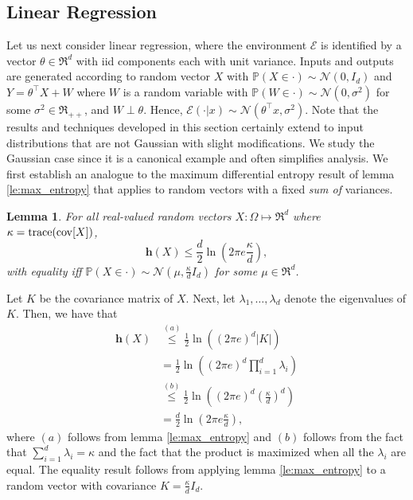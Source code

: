 \documentclass[twoside,11pt]{article}
\renewenvironment{proof}{\par\noindent{\bf Proof\ }}{\hfill\BlackBox\\[2mm]}
\newenvironment{proof}{\par\noindent{\bf Proof\ }}{\hfill\BlackBox\\[2mm]}
\newtheorem{lemma}[theorem]{Lemma}
\def\environment{\mathcal{E}}
\def\normal{\mathcal{N}}
\def\diffentropy{\bf h}
\def\diffentropy{\mathbf{h}}
\def\Pr{\mathbb{P}}
\begin{document}
\subsection{Linear Regression}\label{subsec:lin_reg}
Let us next consider linear regression, where the environment $\environment$ is identified by a vector $\theta\in\Re^d$ with iid components each with unit variance.  Inputs and outputs are generated according to random vector $X$ with $\Pr(X\in\cdot)\sim \mathcal{N}(0, I_d)$ and $Y = \theta^\top X + W$ where $W$ is a random variable with $\Pr(W\in\cdot) \sim \mathcal{N}(0, \sigma^2)$ for some $\sigma^2 \in \Re_{++}$, and $W \perp \theta$. Hence, $\environment(\cdot|x) \sim \normal(\theta^\top x, \sigma^2)$. Note that the results and techniques developed in this section certainly extend to input distributions that are not Gaussian with slight modifications. We study the Gaussian case since it is a canonical example and often simplifies analysis. We first establish an analogue to the maximum differential entropy result of lemma \ref{le:max_entropy} that applies to random vectors with a fixed \emph{sum of} variances. 

\begin{lemma}
    \label{le:max_sum_ent}
    For all real-valued random vectors $X: \Omega\mapsto\Re^d$ where $\kappa = {\rm trace}({\rm cov}[X])$,
    $$\diffentropy(X) \leq \frac{d}{2}\ln\left(2\pi e\frac{\kappa}{d}\right),$$
    with equality iff $\Pr(X\in\cdot)\sim \mathcal{N}(\mu, \frac{\kappa}{d}I_d)$ for some $\mu\in\Re^d$.
\end{lemma}
\begin{proof}
    Let $K$ be the covariance matrix of $X$. Next, let $\lambda_1, \hdots, \lambda_d$ denote the eigenvalues of $K$. Then, we have that
    \begin{align*}
        \diffentropy(X)
        & \overset{(a)}{\leq} \frac{1}{2}\ln\left((2\pi e)^d |K|\right)\\
        & = \frac{1}{2}\ln\left((2\pi e)^d \prod_{i=1}^{d} \lambda_i\right)\\
        & \overset{(b)}{\leq} \frac{1}{2}\ln\left((2\pi e)^d \left(\frac{\kappa}{d}\right)^d\right)\\
        & = \frac{d}{2}\ln\left(2\pi e \frac{\kappa}{d}\right),
    \end{align*}
    where $(a)$ follows from lemma \ref{le:max_entropy} and $(b)$ follows from the fact that $\sum_{i=1}^{d}\lambda_i = \kappa$ and the fact that the product is maximized when all the $\lambda_i$ are equal. The equality result follows from applying lemma \ref{le:max_entropy} to a random vector with covariance $K = \frac{\kappa}{d}I_d$.
\end{proof}
\end{document}
